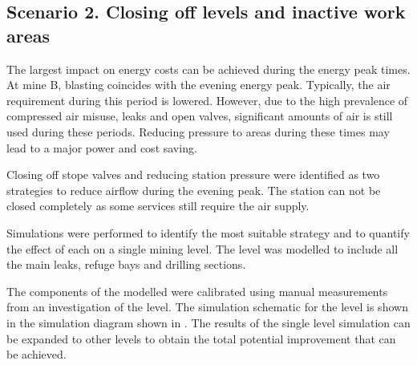	\subsection{Scenario 2. Closing off levels and inactive work areas}
	The largest impact on energy costs can be achieved during the energy peak times. At mine B, blasting coincides with the evening energy peak. Typically, the air requirement during this period is lowered. However, due to the high prevalence of compressed air misuse, leaks and open valves, significant amounts of air is still used during these periods. Reducing pressure to areas during these times may lead to a major power and cost saving. 
	\par 
	Closing off stope valves and reducing station pressure were identified as two strategies to reduce airflow during the evening peak. The station can not be closed completely as some services still require the air supply. 
	\par 
	Simulations were performed to identify the most suitable strategy and to quantify the effect of each on a single mining level. The level was modelled to include all the main leaks, refuge bays and drilling sections. 
	\par 
	The components of the modelled were calibrated using manual measurements from an investigation of the level. The simulation schematic for the level is shown in the simulation diagram shown in . The results of the single level simulation can be expanded to other levels to obtain the total potential improvement that can be achieved.

